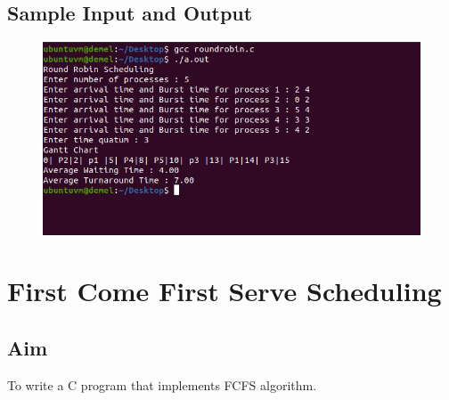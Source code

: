 \documentclass[a4paper]{article}
\begin{document}
\subsection{Sample Input and Output}
\begin{figure}[!h]
	\centering
	\includegraphics[width=\textwidth]{roundrobin.png}
\end{figure}

\section{First Come First Serve Scheduling}

\subsection{Aim}
To write a C program that implements FCFS algorithm.
\end{document}
